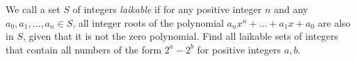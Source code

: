 We call a set $S$ of integers \textit{laikable} if for any positive integer $n$
and any $a_0,a_1,\ldots,a_n\in S$, all integer roots of the polynomial
$a_nx^n+\ldots+a_1x+a_0$ are also in $S$, given that it is not the zero polynomial.
Find all laikable sets of integers that contain all numbers of the form $2^a-2^b$ for positive integers $a, b$.
